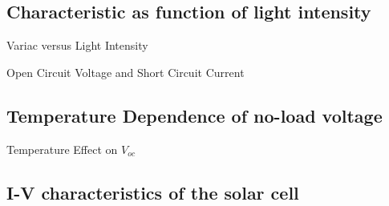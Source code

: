 \subsection{Characteristic as function of light intensity}
\begin{table}[H]
    \centering
    
    \caption{Variac versus Light Intensity}
    \label{tab:variac_data}
\end{table}

\begin{table}[H]
    \centering
    
    \caption{Open Circuit Voltage and Short Circuit Current}
    \label{tab:open_closed_data}
\end{table}

\subsection{Temperature Dependence of no-load voltage}

\begin{table}[H]
    \centering
    
    \caption{Temperature Effect on $V_{oc}$}
    \label{tab:temp_effect_data}
\end{table}
\clearpage
\subsection{I-V characteristics of the solar cell}


